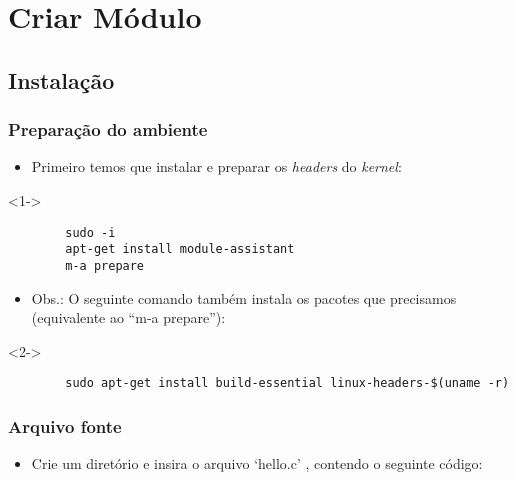 \section{Criar Módulo} %

\subsection*{Instalação} %

\begin{frame}[fragile]
	\frametitle{Preparação do ambiente}
	
	\begin{itemize}
		\item<1-> Primeiro temos que instalar e preparar os \textit{headers} do \textit{kernel}:
	\end{itemize}

	\lstset{language=bash}

	\begin{block}<1->{}
	\begin{lstlisting}
		sudo -i
		apt-get install module-assistant
		m-a prepare
	\end{lstlisting}
	\end{block}

	\begin{itemize}
		\item<2-> Obs.: O seguinte comando também instala os pacotes que precisamos (equivalente ao ``m-a prepare''):
	\end{itemize}

	\begin{block}<2->{}
	\begin{lstlisting}
		sudo apt-get install build-essential linux-headers-$(uname -r)
	\end{lstlisting}
	\end{block}

\end{frame}


\begin{frame}
	\frametitle{Arquivo fonte \nocite{}}
	\begin{itemize}
		\item<1-> Crie um diretório e insira o arquivo `hello.c' \cite{KernelDevelopment} \cite{HelloWorld_Mark}, contendo o seguinte código:
	\end{itemize}
	\lstset{frame=lines}
	
\end{frame}


